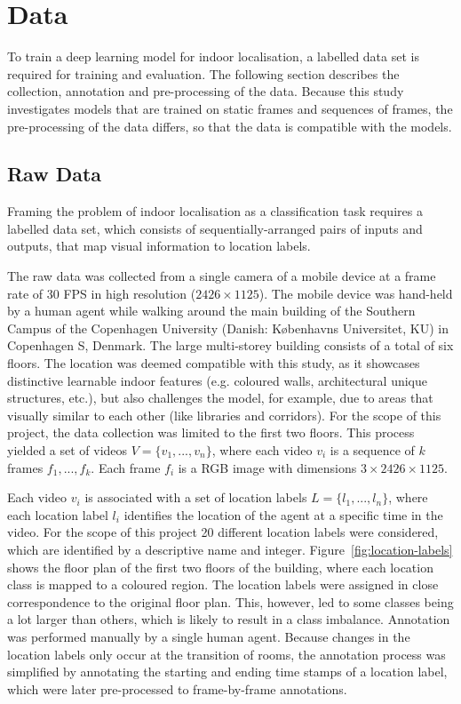 \documentclass[a4paper]{article}
\begin{document}
\section{Data}

To train a deep learning model for indoor localisation, a labelled data set is
required for training and evaluation. The following section describes the
collection, annotation and pre-processing of the data. Because this study
investigates models that are trained on static frames and sequences of
frames, the pre-processing of the data differs, so that the data is compatible
with the models.

\subsection{Raw Data} %
\label{sub:raw-data}

Framing the problem of indoor localisation as a classification task requires a
labelled data set, which consists of sequentially-arranged pairs of inputs and
outputs, that map visual information to location labels. 

The raw data was collected from a single camera of a mobile device at a frame
rate of 30 FPS in high resolution ($2426\times 1125$). The mobile device was
hand-held by a human agent while walking around the main building of the
Southern Campus of the Copenhagen University (Danish: K\o{}benhavns Universitet,
KU) in Copenhagen S, Denmark. The large multi-storey building consists of a
total of six floors. The location was deemed compatible with this study, as it
showcases distinctive learnable indoor features (e.g. coloured walls,
architectural unique structures, etc.), but also challenges the model, for
example, due to areas that visually similar to each other (like libraries and
corridors). For the scope of this project, the data collection was limited to
the first two floors. This process yielded a set of videos $V = \{v_1, ...,
v_n\}$, where each video $v_i$ is a sequence of $k$ frames $f_1, ..., f_k$. Each
frame $f_i$ is a RGB image with dimensions $3 \times 2426 \times 1125$.

Each video $v_i$ is associated with a set of location labels $L = \{l_1, ...,
l_n\}$, where each location label $l_i$ identifies the location of the agent at
a specific time in the video. For the scope of this project 20 different
location labels were considered, which are identified by a descriptive name and
integer. Figure~\ref{fig:location-labels} shows the floor plan of the first two
floors of the building, where each location class is mapped to a coloured
region. The location labels were assigned in close correspondence to the
original floor plan. This, however, led to some classes being a lot larger than
others, which is likely to result in a class imbalance. Annotation was performed
manually by a single human agent. Because changes in the location labels only
occur at the transition of rooms, the annotation process was simplified by
annotating the starting and ending time stamps of a location label, which were
later pre-processed to frame-by-frame annotations. 
\end{document}
